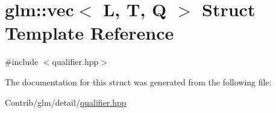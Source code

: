 \hypertarget{structglm_1_1vec}{}\section{glm\+:\+:vec$<$ L, T, Q $>$ Struct Template Reference}
\label{structglm_1_1vec}


{\ttfamily \#include $<$qualifier.\+hpp$>$}



The documentation for this struct was generated from the following file\+:\begin{DoxyCompactItemize}
\item 
Contrib/glm/detail/\mbox{\hyperlink{qualifier_8hpp}{qualifier.\+hpp}}\end{DoxyCompactItemize}
